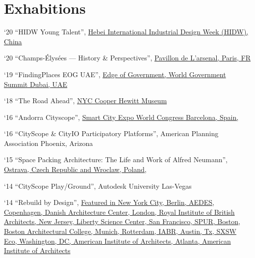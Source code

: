 \section*{Exhabitions}

\begin{tablist}

\item[`20] \tab \enquote{HIDW Young Talent},
\href{http://hidw-en.aty.cn/activity/Default.aspx?id=10000069}{Hebei International Industrial Design Week (HIDW), China}

\item[`20] \tab \enquote{Champs-Élysées — History \& Perspectives},
\href{https://www.pavillon-arsenal.com/en/expositions/11463-champs-elysees.html}{Pavillon de L'arsenal, Paris, FR}

\item[`19] \tab \enquote{FindingPlaces EOG UAE},
\href{https://edge.worldgovernmentsummit.org}{Edge of Government, World Government Summit Dubai, UAE}

\item[`18] \tab \enquote{The Road Ahead},
\href{https://www.cooperhewitt.org/channel/road-ahead/}{NYC Cooper Hewitt Museum}

\item[`16] \tab \enquote{Andorra Cityscope},
\href{https://www.actua.ad/en/actualitat/andorran-projects-attract-international-attention-smart-city-expo-world-congress}{Smart City Expo World Congress Barcelona, Spain,}

\item[`16] \tab \enquote{CityScope \& CityIO Participatory Platforms},
American Planning Association Phoenix, Arizona

\item[`15] \tab \enquote{Space Packing Architecture: The Life and Work of Alfred Neumann},
\href{https://www.archdaily.com/633053/space-packing-architecture-the-life-and-work-of-alfred-neumann?ad_medium=gallery}{Ostrava, Czech Republic and Wroclaw, Poland,}

\item[`14] \tab \enquote{CityScope Play/Ground},
Autodesk University Las-Vegas

\item[`14] \tab \enquote{Rebuild by Design},
\href{https://rebuildbydesign.org/news-and-events/exhibitions/rebuild-by-design-hurricane-sandy-design-competition/}{Featured in New York City, Berlin, AEDES,  Copenhagen, Danish Architecture Center, London, Royal Institute of British Architects, New Jersey, Liberty Science Center, San Francisco, SPUR, Boston, Boston Architectural College, Munich, Rotterdam, IABR, Austin, Tx, SXSW Eco, Washington, DC, American Institute of Architects, Atlanta, American Institute of Architects}


\end{tablist}
